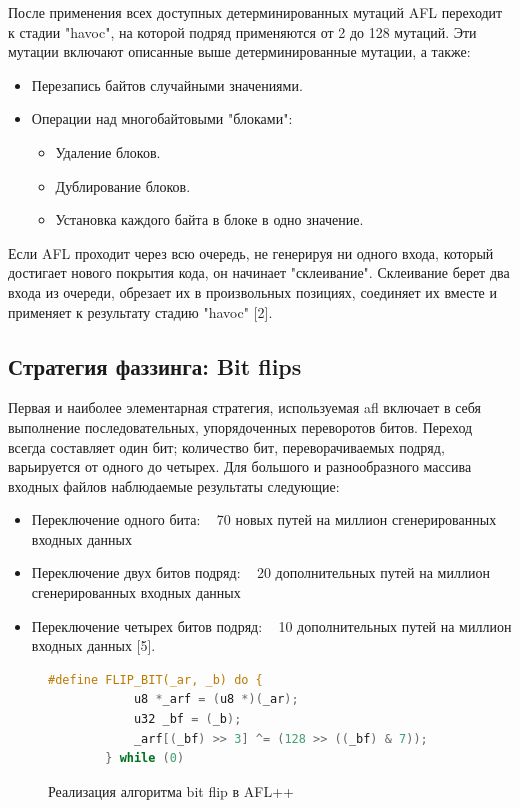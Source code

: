 После применения всех доступных детерминированных мутаций AFL переходит к стадии "havoc", на которой подряд применяются от 2 до 128 мутаций. Эти мутации включают описанные выше детерминированные мутации, а также:
\begin{itemize}
	\item Перезапись байтов случайными значениями.
	\item Операции над многобайтовыми "блоками":
	\begin{itemize}
		\item Удаление блоков.
		\item Дублирование блоков.
		\item Установка каждого байта в блоке в одно значение.
	\end{itemize}
\end{itemize}

Если AFL проходит через всю очередь, не генерируя ни одного входа, который достигает нового покрытия кода, он начинает "склеивание". Склеивание берет два входа из очереди, обрезает их в произвольных позициях, соединяет их вместе и применяет к результату стадию "havoc"  [2].

\subsection{Стратегия фаззинга: Bit flips} \label{ch2:bit-flips}
Первая и наиболее элементарная стратегия, используемая afl включает в себя выполнение последовательных, упорядоченных переворотов битов. Переход всегда составляет один бит; количество бит, переворачиваемых подряд, варьируется от одного до четырех. Для большого и разнообразного массива входных файлов наблюдаемые результаты следующие:

\begin{itemize}
	\item Переключение одного бита: ~ 70 новых путей на миллион сгенерированных входных данных
	\item Переключение двух битов подряд: ~ 20 дополнительных путей на миллион сгенерированных входных данных
	\item Переключение четырех битов подряд: ~ 10 дополнительных путей на миллион входных данных [5].
\end{itemize}

\begin{figure}[ht]
	\begin{lstlisting}[language=C]
		#define FLIP_BIT(_ar, _b) do { 
			u8 *_arf = (u8 *)(_ar);      
			u32 _bf = (_b);              
			_arf[(_bf) >> 3] ^= (128 >> ((_bf) & 7)); 
		} while (0)
	\end{lstlisting}
	\caption{Реализация алгоритма bit flip в AFL++}\label{fig:flip-bit}
\end{figure}

